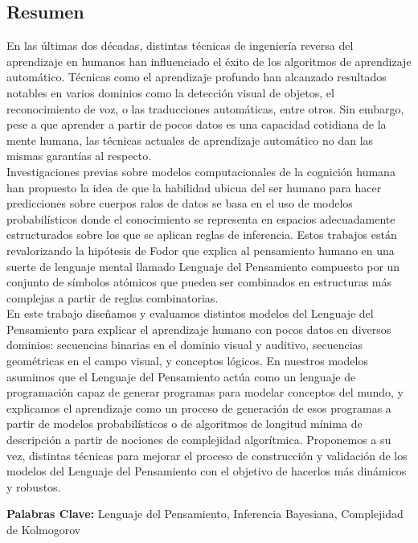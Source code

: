 \rhead{}
\lhead{}
\renewcommand{\headrulewidth}{0pt}
\begin{center}
    \section*{Resumen}
\end{center}

En las últimas dos décadas, distintas técnicas de ingeniería reversa del aprendizaje en humanos han influenciado el éxito de los algoritmos de aprendizaje automático. Técnicas como el aprendizaje profundo han alcanzado resultados notables en varios dominios como la detección visual de objetos, el reconocimiento de voz, o las traducciones automáticas, entre otros. Sin embargo, pese a que aprender a partir de pocos datos es una capacidad cotidiana de la mente humana, las técnicas actuales de aprendizaje automático no dan las mismas garantías al respecto.\\

\medskip
Investigaciones previas sobre modelos computacionales de la cognición humana han propuesto la idea de que la habilidad ubicua del ser humano para hacer predicciones sobre cuerpos ralos de datos se basa en el uso de modelos probabilísticos donde el conocimiento se representa en espacios adecuadamente estructurados sobre los que se aplican reglas de inferencia. Estos trabajos están revalorizando la hipótesis de Fodor que explica al pensamiento humano en una suerte de lenguaje mental llamado Lenguaje del Pensamiento compuesto por un conjunto de símbolos atómicos que pueden ser combinados en estructuras más complejas a partir de reglas combinatorias.\\

\medskip
En este trabajo diseñamos y evaluamos distintos modelos del Lenguaje del Pensamiento para explicar el aprendizaje humano con pocos datos en diversos dominios: secuencias binarias en el dominio visual y auditivo, secuencias geométricas en el campo visual, y conceptos lógicos. En nuestros modelos asumimos que el Lenguaje del Pensamiento actúa como un lenguaje de programación capaz de generar programas para modelar conceptos del mundo, y explicamos el aprendizaje como un proceso de generación de esos programas a partir de modelos probabilísticos o de algoritmos de longitud mínima de descripción a partir de nociones de complejidad algorítmica. Proponemos a su vez, distintas técnicas para mejorar el proceso de construcción y validación de los modelos del Lenguaje del Pensamiento con el objetivo de hacerlos más dinámicos y robustos.
\vfill


\textbf{Palabras Clave:} Lenguaje del Pensamiento, Inferencia Bayesiana, Complejidad de Kolmogorov